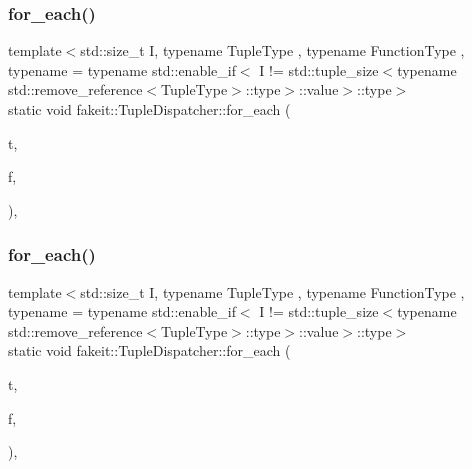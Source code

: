 \mbox{\label{structfakeit_1_1TupleDispatcher_afd32e025fbf695e16bb4b4ac1642c491}} 
\subsubsection{\texorpdfstring{for\_each()}{for\_each()}\hspace{0.1cm}{\footnotesize\ttfamily [12/54]}}
{\footnotesize\ttfamily template$<$std\+::size\+\_\+t I, typename Tuple\+Type , typename Function\+Type , typename  = typename std\+::enable\+\_\+if$<$            I != std\+::tuple\+\_\+size$<$typename std\+::remove\+\_\+reference$<$\+Tuple\+Type$>$\+::type$>$\+::value$>$\+::type$>$ \\
static void fakeit\+::\+Tuple\+Dispatcher\+::for\+\_\+each (\begin{DoxyParamCaption}\item[{Tuple\+Type \&\&}]{t,  }\item[{Function\+Type \&}]{f,  }\item[{std\+::integral\+\_\+constant$<$ size\+\_\+t, I $>$}]{ }\end{DoxyParamCaption})\hspace{0.3cm}{\ttfamily [inline]}, {\ttfamily [static]}}

\mbox{\label{structfakeit_1_1TupleDispatcher_afd32e025fbf695e16bb4b4ac1642c491}} 
\subsubsection{\texorpdfstring{for\_each()}{for\_each()}\hspace{0.1cm}{\footnotesize\ttfamily [13/54]}}
{\footnotesize\ttfamily template$<$std\+::size\+\_\+t I, typename Tuple\+Type , typename Function\+Type , typename  = typename std\+::enable\+\_\+if$<$            I != std\+::tuple\+\_\+size$<$typename std\+::remove\+\_\+reference$<$\+Tuple\+Type$>$\+::type$>$\+::value$>$\+::type$>$ \\
static void fakeit\+::\+Tuple\+Dispatcher\+::for\+\_\+each (\begin{DoxyParamCaption}\item[{Tuple\+Type \&\&}]{t,  }\item[{Function\+Type \&}]{f,  }\item[{std\+::integral\+\_\+constant$<$ size\+\_\+t, I $>$}]{ }\end{DoxyParamCaption})\hspace{0.3cm}{\ttfamily [inline]}, {\ttfamily [static]}}

